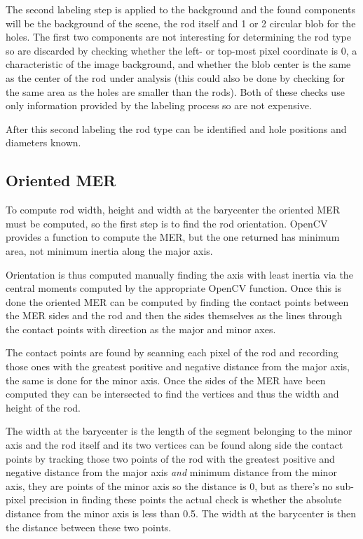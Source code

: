 The second labeling step is applied to the background and the found components will be the background of the scene, the rod itself and 1 or 2 circular blob for the holes.
The first two components are not interesting for determining the rod type so are discarded by checking whether the left- or top-most pixel coordinate is 0, a characteristic of the image background, and whether the blob center is the same as the center of the rod under analysis (this could also be done by checking for the same area as the holes are smaller than the rods).
Both of these checks use only information provided by the labeling process so are not expensive.

After this second labeling the rod type can be identified and hole positions and diameters known.

\subsection{Oriented MER}
To compute rod width, height and width at the barycenter the oriented MER must be computed, so the first step is to find the rod orientation.
OpenCV provides a function to compute the MER, but the one returned has minimum area, not minimum inertia along the major axis.

Orientation is thus computed manually finding the axis with least inertia via the central moments computed by the appropriate OpenCV function.
Once this is done the oriented MER can be computed by finding the contact points between the MER sides and the rod and then the sides themselves as the lines through the contact points with direction as the major and minor axes.

The contact points are found by scanning each pixel of the rod and recording those ones with the greatest positive and negative distance from the major axis, the same is done for the minor axis.
Once the sides of the MER have been computed they can be intersected to find the vertices and thus the width and height of the rod.

The width at the barycenter is the length of the segment belonging to the minor axis and the rod itself and its two vertices can be found along side the contact points by tracking those two points of the rod with the greatest positive and negative distance from the major axis \textit{and} minimum distance from the minor axis, \ie they are points of the minor axis so the distance is 0, but as there's no sub-pixel precision in finding these points the actual check is whether the absolute distance from the minor axis is less than 0.5.
The width at the barycenter is then the distance between these two points.


